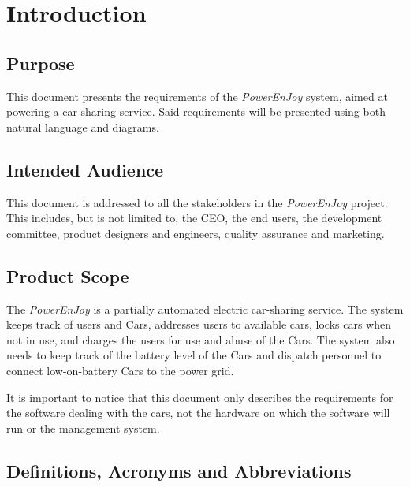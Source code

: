 \section{Introduction}

\subsection{Purpose}
This document presents the requirements of the \emph{PowerEnJoy} system, aimed at powering a car-sharing service. Said requirements will be presented using both natural language and diagrams.

\subsection{Intended Audience}
This document is addressed to all the stakeholders in the \emph{PowerEnJoy} project. This includes, but is not limited to, the CEO, the end users, the development committee, product designers and engineers, quality assurance and marketing.

\subsection{Product Scope}
The \emph{PowerEnJoy} is a partially automated electric car-sharing service. The system keeps track of users and Cars, addresses users to available cars, locks cars when not in use, and charges the users for use and abuse of the Cars. The system also needs to keep track of the battery level of the Cars and dispatch personnel to connect low-on-battery Cars to the power grid.

It is important to notice that this document only describes the requirements for the software dealing with the cars, not the hardware on which the software will run or the management system.

\subsection{Definitions, Acronyms and Abbreviations}

